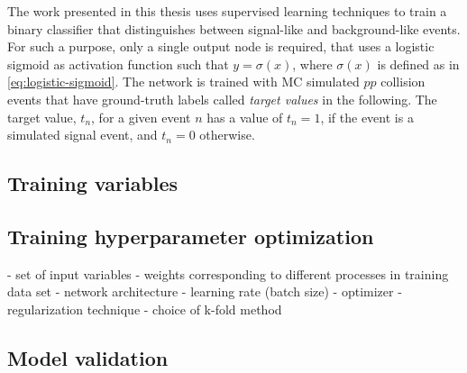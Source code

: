 The work presented in this thesis uses supervised learning techniques to train a binary classifier that distinguishes between signal-like and background-like events. 
For such a purpose, only a single output node is required, that uses a logistic sigmoid as activation function such that $y = \sigma(x)$, where $\sigma(x)$ is defined as in \cref{eq:logistic-sigmoid}.
The network is trained with MC simulated $pp$ collision events that have ground-truth labels called \emph{target values} in the following. The target value, $t_n$, for a given event $n$ has a value of $t_n = 1$, if the event is a simulated signal event, and $t_n = 0$ otherwise.

\subsection{Training variables}
\subsection{Training hyperparameter optimization}

- set of input variables
- weights corresponding to different processes in training data set
- network architecture
- learning rate (batch size)
- optimizer
- regularization technique
- choice of k-fold method
\subsection{Model validation}
